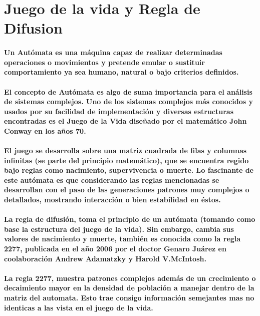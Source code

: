 \section{Juego de la vida y Regla de Difusion}
  \paragraph{
  	Un Autómata es una máquina capaz de realizar determinadas operaciones o movimientos y pretende emular o sustituir comportamiento ya sea humano, natural o bajo criterios definidos.
  }
  \paragraph{
  	El concepto de Autómata es algo de suma importancia para el análisis de sistemas complejos. Uno de los sistemas complejos más conocidos y usados por su facilidad de implementación y diversas estructuras encontradas es el \textbf{Juego de la Vida} diseñado por el matemático John Conway en los años 70.
  }

  \paragraph{
  	El juego se desarrolla sobre una matriz cuadrada de filas y columnas infinitas (se parte del principio matemático), que se encuentra regido bajo reglas como nacimiento, supervivencia o muerte. Lo fascinante de este autómata es que considerando las reglas mencionadas se desarrollan con el paso de las generaciones patrones muy complejos o detallados, mostrando interacción o bien estabilidad en éstos.
  }
  \paragraph{
  	La regla de difusión, toma el principio de un autómata (tomando como base la estructura del juego de la vida). Sin embargo, cambia sus valores de nacimiento y muerte, también es conocida como la regla 2277, publicada en el año 2006 por el doctor Genaro Juárez en coolaboración Andrew Adamatzky y Harold V.McIntosh.
  }
  \paragraph{
  	La regla 2277, muestra patrones complejos además de un crecimiento o decaimiento mayor en la densidad de población a manejar dentro de la matriz del automata. Esto trae consigo información semejantes mas no identicas a las vista en el juego de la vida.
  }
  \clearpage
